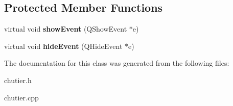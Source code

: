 \subsection*{\-Protected \-Member \-Functions}
\begin{DoxyCompactItemize}
\item 
\hypertarget{class_chutier_a2a25ab89f0bbbb410bcbada8d1229919}{virtual void {\bfseries show\-Event} (\-Q\-Show\-Event $\ast$e)}\label{class_chutier_a2a25ab89f0bbbb410bcbada8d1229919}

\item 
\hypertarget{class_chutier_aebebc2251eaefb0f3fc93d563e76665d}{virtual void {\bfseries hide\-Event} (\-Q\-Hide\-Event $\ast$e)}\label{class_chutier_aebebc2251eaefb0f3fc93d563e76665d}

\end{DoxyCompactItemize}


\-The documentation for this class was generated from the following files\-:\begin{DoxyCompactItemize}
\item 
chutier.\-h\item 
chutier.\-cpp\end{DoxyCompactItemize}
